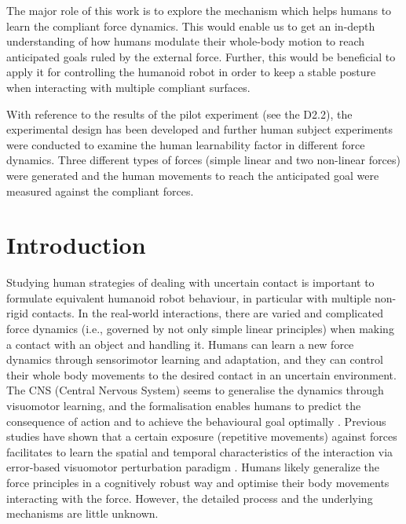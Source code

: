 

\newcommand{\BF}{\mathbf{F}}
\newcommand{\BZ}{\mathbf{Z}}
\newcommand{\BA}{\mathbf{A}}
\newcommand{\BB}{\mathbf{B}}
\newcommand{\BC}{\mathbf{C}}
\newcommand{\BD}{\mathbf{D}}

The major role of this work is to explore the mechanism which helps humans to learn the compliant force dynamics. This would enable us to get an in-depth understanding of how humans modulate their whole-body motion to reach anticipated goals ruled by the external force. Further, this would be beneficial to apply it for controlling the humanoid robot in order to keep a stable posture when interacting with multiple compliant surfaces. 

With reference to the results of the pilot experiment (see the D2.2), the experimental design has been developed and further human subject experiments were conducted to examine the human learnability factor in different force dynamics. Three different types of forces (simple linear and two non-linear forces) were generated and the human movements to reach the anticipated goal were measured against the compliant forces.
\section{Introduction}

Studying human strategies of dealing with uncertain contact is important to formulate equivalent humanoid robot behaviour, in particular with multiple non-rigid contacts. In the real-world interactions, there are varied and complicated force dynamics (i.e., governed by not only simple linear principles) when making a contact with an object and handling it. Humans can learn a new force dynamics through sensorimotor learning and adaptation, and they can control their whole body movements to the desired contact in an uncertain environment. The CNS (Central Nervous System) seems to generalise the dynamics through visuomotor learning, and the formalisation enables humans to predict the consequence of action and to achieve the behavioural goal optimally \cite{Wolpert2011, Davidson2003}. Previous studies have shown that a certain exposure (repetitive movements) against forces facilitates to learn the spatial and temporal characteristics of the interaction via error-based visuomotor perturbation paradigm \cite{Goodbody1998, Krakuer2006}. Humans likely generalize the force principles in a cognitively robust way and optimise their body movements interacting with the force. However, the detailed process and the underlying mechanisms are little unknown.

